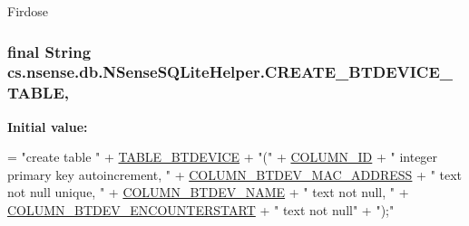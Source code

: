 Firdose \hypertarget{classcs_1_1nsense_1_1db_1_1_n_sense_s_q_lite_helper_a0327a832a45bc2c75ba4a833d1385001}{
\subsubsection[{C\-R\-E\-A\-T\-E\-\_\-\-B\-T\-D\-E\-V\-I\-C\-E\-\_\-\-T\-A\-B\-L\-E}]{\setlength{\rightskip}{0pt plus 5cm}final String cs.\-nsense.\-db.\-N\-Sense\-S\-Q\-Lite\-Helper.\-C\-R\-E\-A\-T\-E\-\_\-\-B\-T\-D\-E\-V\-I\-C\-E\-\_\-\-T\-A\-B\-L\-E\hspace{0.3cm}{\ttfamily [static]}, {\ttfamily [private]}}}\label{classcs_1_1nsense_1_1db_1_1_n_sense_s_q_lite_helper_a0327a832a45bc2c75ba4a833d1385001}
{\bfseries Initial value\-:}
\begin{DoxyCode}
= \textcolor{stringliteral}{"create table "}
            + \hyperlink{classcs_1_1nsense_1_1db_1_1_n_sense_s_q_lite_helper_a6962c6911182283046c7abc906fbb2ab}{TABLE\_BTDEVICE} + \textcolor{stringliteral}{"("}
            + \hyperlink{classcs_1_1nsense_1_1db_1_1_n_sense_s_q_lite_helper_a42c92e67b4392524cb4f6bf4c4da4c79}{COLUMN\_ID} + \textcolor{stringliteral}{" integer primary key autoincrement, "}
            + \hyperlink{classcs_1_1nsense_1_1db_1_1_n_sense_s_q_lite_helper_a66d760b81948efc86eafb0bb5147c2a5}{COLUMN\_BTDEV\_MAC\_ADDRESS} + \textcolor{stringliteral}{" text not null unique, "}
            + \hyperlink{classcs_1_1nsense_1_1db_1_1_n_sense_s_q_lite_helper_aa5c997c964929bd8d27ae424aec82f4d}{COLUMN\_BTDEV\_NAME} + \textcolor{stringliteral}{" text not null, "}
            + \hyperlink{classcs_1_1nsense_1_1db_1_1_n_sense_s_q_lite_helper_a9356c28b162b3997d82d6c078634ec10}{COLUMN\_BTDEV\_ENCOUNTERSTART} + \textcolor{stringliteral}{" text not null"}
            + \textcolor{stringliteral}{");"}
\end{DoxyCode}
